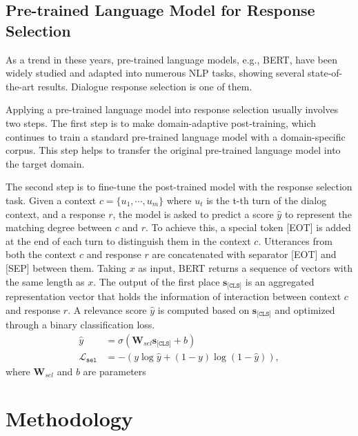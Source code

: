 \documentclass[letterpaper]{article} \usepackage{aaai22}  \usepackage{times}  \usepackage{helvet}  \usepackage{courier}  \usepackage[hyphens]{url}  \usepackage{graphicx} \urlstyle{rm} \def\UrlFont{\rm}  \usepackage{natbib}  \usepackage{caption} \DeclareCaptionStyle{ruled}{labelfont=normalfont,labelsep=colon,strut=off} \frenchspacing  \setlength{\pdfpagewidth}{8.5in}  \setlength{\pdfpageheight}{11in}  \usepackage{algorithm}
\begin{document}
\subsection{Pre-trained Language Model for Response Selection}

As a trend in these years, pre-trained language models, e.g., BERT\cite{devlin2018bert}, have been widely studied and adapted into numerous NLP tasks, showing several state-of-the-art results. Dialogue response selection is one of them. 

Applying a pre-trained language model into response selection usually involves two steps. The first step is to make domain-adaptive post-training, which continues to train a standard pre-trained language model with a domain-specific corpus. This step helps to transfer the original pre-trained language model into the target domain. 

The second step is to fine-tune the post-trained model with the response selection task. Given a context $c=\{u_1, \cdots, u_m\}$ where $u_t$ is the t-th turn of the dialog context, and a response $r$, the model is asked to predict a score $\hat{y}$ to represent the matching degree between $c$ and $r$. To achieve this, a special token [EOT] is added at the end of each turn to distinguish them in the context $c$. 
Utterances from both the context $c$ and response $r$ are concatenated with separator [EOT] and [SEP] between them.
Taking $x$ as input, BERT returns a sequence of vectors with the same length as $x$. The output of the first place $\mathbf{s}_{\texttt{[CLS]}}$ is an aggregated representation vector that holds the information of interaction between context $c$ and response $r$. A relevance score $\hat{y}$ is computed based on $\mathbf{s}_{\texttt{[CLS]}}$ and optimized through a binary classification loss. 
\begin{equation}
    \begin{aligned}
    \hat{y} &= \sigma ( \mathbf{W}_{sel} \mathbf{s}_{\texttt{[CLS]}} + b ) \\
    \mathcal{L}_{\texttt{sel}} &= - \left(  y \log \hat{y} + (1 - y) \log (1 - \hat{y}) \right),
    \end{aligned}
\end{equation} where $\mathbf{W}_{sel}$ and $b$ are parameters 





\section{Methodology}
\end{document}
